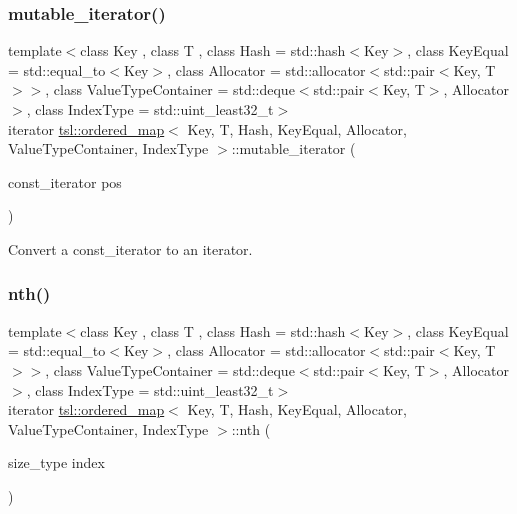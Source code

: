 \subsubsection{\texorpdfstring{mutable\_iterator()}{mutable\_iterator()}}
{\footnotesize\ttfamily template$<$class Key , class T , class Hash  = std\+::hash$<$\+Key$>$, class Key\+Equal  = std\+::equal\+\_\+to$<$\+Key$>$, class Allocator  = std\+::allocator$<$std\+::pair$<$\+Key, T$>$$>$, class Value\+Type\+Container  = std\+::deque$<$std\+::pair$<$\+Key, T$>$, Allocator$>$, class Index\+Type  = std\+::uint\+\_\+least32\+\_\+t$>$ \\
iterator \mbox{\hyperlink{classtsl_1_1ordered__map}{tsl\+::ordered\+\_\+map}}$<$ Key, T, Hash, Key\+Equal, Allocator, Value\+Type\+Container, Index\+Type $>$\+::mutable\+\_\+iterator (\begin{DoxyParamCaption}\item[{const\+\_\+iterator}]{pos }\end{DoxyParamCaption})\hspace{0.3cm}{\ttfamily [inline]}}

Convert a const\+\_\+iterator to an iterator. \mbox{\label{classtsl_1_1ordered__map_a93bb4548ff4b0fd8dddfc5d7e3da6095}} 
\subsubsection{\texorpdfstring{nth()}{nth()}\hspace{0.1cm}{\footnotesize\ttfamily [1/2]}}
{\footnotesize\ttfamily template$<$class Key , class T , class Hash  = std\+::hash$<$\+Key$>$, class Key\+Equal  = std\+::equal\+\_\+to$<$\+Key$>$, class Allocator  = std\+::allocator$<$std\+::pair$<$\+Key, T$>$$>$, class Value\+Type\+Container  = std\+::deque$<$std\+::pair$<$\+Key, T$>$, Allocator$>$, class Index\+Type  = std\+::uint\+\_\+least32\+\_\+t$>$ \\
iterator \mbox{\hyperlink{classtsl_1_1ordered__map}{tsl\+::ordered\+\_\+map}}$<$ Key, T, Hash, Key\+Equal, Allocator, Value\+Type\+Container, Index\+Type $>$\+::nth (\begin{DoxyParamCaption}\item[{size\+\_\+type}]{index }\end{DoxyParamCaption})\hspace{0.3cm}{\ttfamily [inline]}}

